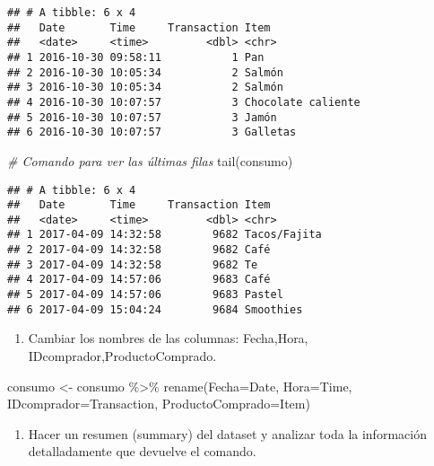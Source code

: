\documentclass[
]{book}
\newenvironment{Shaded}{\begin{snugshade}}{\end{snugshade}}
\newcommand{\AttributeTok}[1]{\textcolor[rgb]{0.77,0.63,0.00}{#1}}
\newcommand{\CommentTok}[1]{\textcolor[rgb]{0.56,0.35,0.01}{\textit{#1}}}
\newcommand{\FunctionTok}[1]{\textcolor[rgb]{0.00,0.00,0.00}{#1}}
\newcommand{\NormalTok}[1]{#1}
\newcommand{\OtherTok}[1]{\textcolor[rgb]{0.56,0.35,0.01}{#1}}
\newcommand{\SpecialCharTok}[1]{\textcolor[rgb]{0.00,0.00,0.00}{#1}}
\providecommand{\tightlist}{%
  \setlength{\itemsep}{0pt}\setlength{\parskip}{0pt}}
\begin{document}
\begin{verbatim}
## # A tibble: 6 x 4
##   Date       Time     Transaction Item              
##   <date>     <time>         <dbl> <chr>             
## 1 2016-10-30 09:58:11           1 Pan               
## 2 2016-10-30 10:05:34           2 Salmón            
## 3 2016-10-30 10:05:34           2 Salmón            
## 4 2016-10-30 10:07:57           3 Chocolate caliente
## 5 2016-10-30 10:07:57           3 Jamón             
## 6 2016-10-30 10:07:57           3 Galletas
\end{verbatim}

\begin{Shaded}
\begin{Highlighting}[]
\CommentTok{\# Comando para ver las últimas filas}
\FunctionTok{tail}\NormalTok{(consumo)}
\end{Highlighting}
\end{Shaded}

\begin{verbatim}
## # A tibble: 6 x 4
##   Date       Time     Transaction Item        
##   <date>     <time>         <dbl> <chr>       
## 1 2017-04-09 14:32:58        9682 Tacos/Fajita
## 2 2017-04-09 14:32:58        9682 Café        
## 3 2017-04-09 14:32:58        9682 Te          
## 4 2017-04-09 14:57:06        9683 Café        
## 5 2017-04-09 14:57:06        9683 Pastel      
## 6 2017-04-09 15:04:24        9684 Smoothies
\end{verbatim}

\begin{enumerate}
\def\labelenumi{\arabic{enumi}.}
\setcounter{enumi}{4}
\tightlist
\item
  Cambiar los nombres de las columnas: Fecha,Hora, IDcomprador,ProductoComprado.
\end{enumerate}

\begin{Shaded}
\begin{Highlighting}[]
\NormalTok{consumo }\OtherTok{\textless{}{-}}\NormalTok{ consumo }\SpecialCharTok{\%\textgreater{}\%} \FunctionTok{rename}\NormalTok{(}\AttributeTok{Fecha=}\NormalTok{Date, }\AttributeTok{Hora=}\NormalTok{Time, }\AttributeTok{IDcomprador=}\NormalTok{Transaction, }\AttributeTok{ProductoComprado=}\NormalTok{Item)}
\end{Highlighting}
\end{Shaded}

\begin{enumerate}
\def\labelenumi{\arabic{enumi}.}
\setcounter{enumi}{5}
\tightlist
\item
  Hacer un resumen (summary) del dataset y analizar toda la información detalladamente que devuelve el comando.
\end{enumerate}
\end{document}
